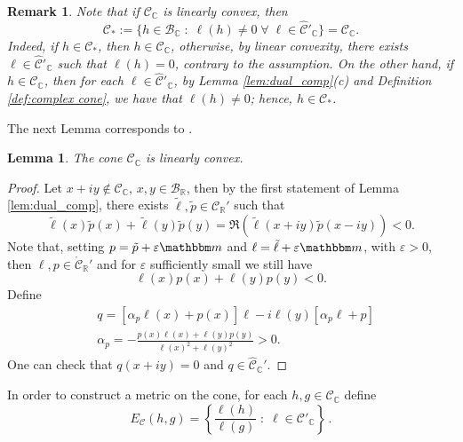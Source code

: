 \documentclass{amsart}
\numberwithin{equation}{section}
\newtheorem{lem}[thm]{Lemma}
\newtheorem{rem}[thm]{Remark}
\newcommand\cB{{\mathcal B}}
\newcommand\cC{{\mathcal C}}
\newcommand\bC{{\mathbb C}}
\newcommand\bR{{\mathbb R}}
\newcommand\ve{\varepsilon}
\newcommand{\bbm}{\mathbbm m}
\begin{document}
\begin{rem} \label{rem:cstar=c}
Note that if $\cC_\bC$ is linearly convex, then 
\[
\cC_*:=\{h\in\cB_\bC\;:\; \ell(h)\neq 0\;\forall\; \ell \in \hat\cC'_\bC\}=\cC_{\bC}.
\]
Indeed, if $h\in\cC_*$, then $h\in \cC_{\bC}$, otherwise, by linear convexity, there exists $\ell\in\hat\cC'_\bC$ such that $\ell(h)=0$, contrary to the assumption. On the other hand, if $h\in\cC_\bC$, then for each $\ell \in \hat\cC'_\bC$, by Lemma \ref{lem:dual_comp}(c) and Definition \ref{def:complex cone}, we have that $\ell(h)\neq 0$; hence, $h\in\cC_*$.
\end{rem}

The next Lemma corresponds to \cite[Lemma 4.1]{Du11}.

\begin{lem}\label{lem:lincox} The cone $\cC_\bC$ is linearly convex.
\end{lem}
\begin{proof}
Let $x+iy\not \in\cC_\bC$, $x,y\in\cB_\bR$, then by the first statement of Lemma \ref{lem:dual_comp}, there exists $\tilde \ell, \tilde p\in\cC_\bR'$ such that
\[
\tilde \ell(x)\tilde p(x)+\tilde \ell(y)\tilde p(y)=\Re(\tilde \ell(x+iy)\tilde p(x-iy))<0.
\]
Note that, setting $p=\tilde p+\ve \bbm$ and $\ell=\tilde \ell+\ve\bbm$, with $\ve>0$, then $\ell, p\in\mathring{\cC}_\bR'$ and for $\ve$ sufficiently small we still have
\begin{equation}\label{eq:basic_lincovex}
\ell(x) p(x)+\ell(y) p(y)<0.
\end{equation}
Define
\[
\begin{split}
&q=[\alpha_p \ell(x)+p(x)]\ell-i\ell(y)[\alpha_p\ell+p]\\
&\alpha_p=-\frac{p(x)\ell(x)+\ell(y)p(y)}{\ell(x)^2+\ell(y)^2}>0.
\end{split}
\]
One can check that $q(x+iy)=0$ and $q\in\hat \cC_\bC'$. 
\end{proof}

In order to construct a metric on the cone, for each $h,g\in\cC_{\bC}$ define
\begin{equation}\label{eq:gauge}
E_\cC(h,g)=\left\{\frac{\ell(h)}{\ell(g)}\;:\; \ell\in\cC'_{\bC}\right\} \, .
\end{equation}
\end{document}
